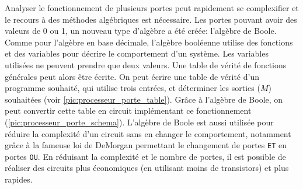     Analyser le fonctionnement de plusieurs portes peut rapidement se complexifier et le recours à des méthodes algébriques est nécessaire. Les portes pouvant avoir des valeurs de 0 ou 1, un nouveau type d'algèbre a été créée: l'algèbre de Boole. Comme pour l'algèbre en base décimale, l'algèbre booléenne utilise des fonctions et des variables pour décrire le comportement d'un système. Les variables utilisées ne peuvent prendre que deux valeurs. Une table de vérité de fonctions générales peut alors être écrite. On peut écrire une table de vérité d'un programme souhaité, qui utilise trois entrées, et déterminer les sorties ($M$) souhaitées (voir \autoref{pic:processeur_porte_table}). Grâce à l'algèbre de Boole, on peut convertir cette table en circuit implémentant ce fonctionnement (\autoref{pic:processeur_porte_schema}).
    L'algèbre de Boole est aussi utilisée pour réduire la complexité d'un circuit sans en changer le comportement, notamment grâce à la fameuse loi de DeMorgan \cite{hurley2014concise} permettant le changement de portes \verb|ET| en portes \verb|OU|. En réduisant la complexité et le nombre de portes, il est possible de réaliser des circuits plus économiques (en utilisant moins de transistors) et plus rapides.
    
